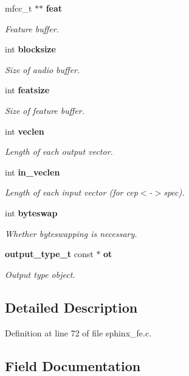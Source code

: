 \begin{DoxyCompactItemize}
mfcc\-\_\-t $\ast$$\ast$ {\bf feat}
\begin{DoxyCompactList}\small\item\em Feature buffer. \end{DoxyCompactList}\item 
int {\bf blocksize}
\begin{DoxyCompactList}\small\item\em Size of audio buffer. \end{DoxyCompactList}\item 
int {\bf featsize}
\begin{DoxyCompactList}\small\item\em Size of feature buffer. \end{DoxyCompactList}\item 
int {\bf veclen}
\begin{DoxyCompactList}\small\item\em Length of each output vector. \end{DoxyCompactList}\item 
int {\bf in\-\_\-veclen}
\begin{DoxyCompactList}\small\item\em Length of each input vector (for cep$<$-\/$>$spec). \end{DoxyCompactList}\item 
int {\bf byteswap}
\begin{DoxyCompactList}\small\item\em Whether byteswapping is necessary. \end{DoxyCompactList}\item 
{\bf output\-\_\-type\-\_\-t} const $\ast$ {\bf ot}
\begin{DoxyCompactList}\small\item\em Output type object. \end{DoxyCompactList}\end{DoxyCompactItemize}


\subsection{Detailed Description}


Definition at line 72 of file sphinx\-\_\-fe.\-c.



\subsection{Field Documentation}

